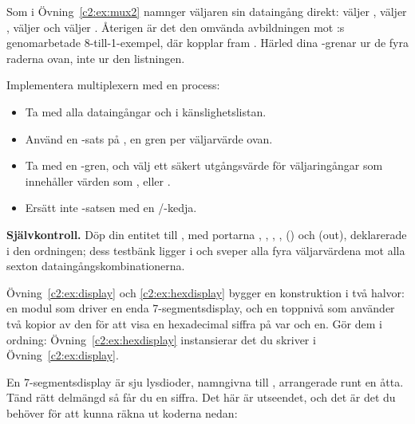 Som i Övning~\ref{c2:ex:mux2} namnger väljaren sin dataingång direkt:  väljer ,
 väljer ,  väljer  och  väljer .
Återigen är det den omvända avbildningen mot :s genomarbetade
8-till-1-exempel, där  kopplar fram . Härled dina -grenar ur
de fyra raderna ovan, inte ur den listningen.

Implementera multiplexern med en process:
\begin{itemize}
  \item Ta med alla dataingångar och  i känslighetslistan.
  \item Använd en -sats på , en gren per väljarvärde ovan.
  \item Ta med en -gren, och välj ett säkert utgångsvärde för väljaringångar som
    innehåller värden som ,  eller .
  \item Ersätt inte -satsen med en /-kedja.
\end{itemize}


\begin{selfcheck}
\textbf{Självkontroll.} Döp din entitet till , med portarna , ,
, ,  () och  (out),
deklarerade i den ordningen; dess testbänk ligger i  och sveper alla fyra
väljarvärdena mot alla sexton dataingångskombinationerna.
\end{selfcheck}


Övning~\ref{c2:ex:display} och \ref{c2:ex:hexdisplay} bygger en konstruktion i två halvor: en
modul som driver en enda 7-segmentsdisplay, och en toppnivå som använder två kopior av den för att
visa en hexadecimal siffra på var och en. Gör dem i ordning: Övning~\ref{c2:ex:hexdisplay}
instansierar det du skriver i Övning~\ref{c2:ex:display}.

En 7-segmentsdisplay är sju lysdioder, namngivna  till , arrangerade runt en åtta.
Tänd rätt delmängd så får du en siffra. Det här är utseendet, och det är det du behöver för att
kunna räkna ut koderna nedan:

